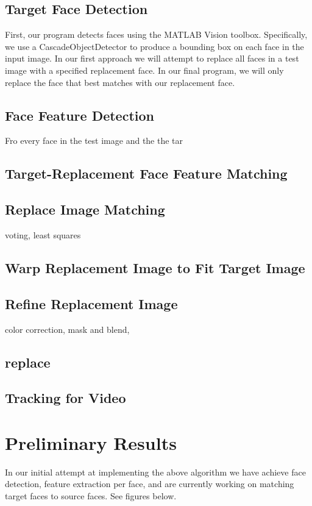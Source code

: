 \documentclass[10pt, twocolumn]{article}
\begin{document}
\subsection{Target Face Detection}
First, our program detects faces using the MATLAB Vision toolbox. Specifically, we use a CascadeObjectDetector to produce a bounding box on each face in the input image. In our first approach we will attempt to replace all faces in a test image with a specified replacement face. In our final program, we will only replace the face that best matches with our replacement face. 

\subsection{Face Feature Detection}
Fro every face in the test image and the the tar

\subsection{Target-Replacement Face Feature Matching}

\subsection{Replace Image Matching}
voting, least squares
\subsection{Warp Replacement Image to Fit Target Image}
\subsection{Refine Replacement Image}
color correction, mask and blend, 
\subsection{replace}
\subsection{Tracking for Video}


\section{Preliminary Results} 
In our initial attempt at implementing the above algorithm we have achieve face detection, feature extraction per face, and are currently working on matching target faces to source faces. See figures below.
\end{document}
